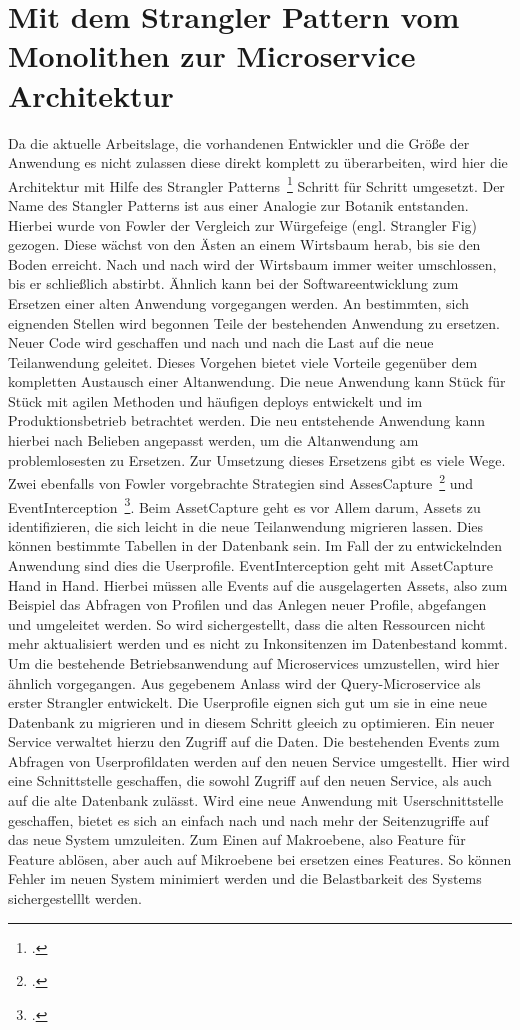 \section{Mit dem Strangler Pattern vom Monolithen zur Microservice Architektur}
Da die aktuelle Arbeitslage, die vorhandenen Entwickler und die Größe der Anwendung es nicht zulassen diese direkt komplett zu überarbeiten, wird hier die Architektur mit Hilfe des Strangler Patterns~\footcite[][]{Fowler:Strangler} Schritt für Schritt umgesetzt.
Der Name des Stangler Patterns ist aus einer Analogie zur Botanik entstanden. Hierbei wurde von Fowler der Vergleich zur Würgefeige (engl. Strangler Fig) gezogen. Diese wächst von den Ästen an einem Wirtsbaum herab, bis sie den Boden erreicht. Nach und nach wird der Wirtsbaum immer weiter umschlossen, bis er schließlich abstirbt.
Ähnlich kann bei der Softwareentwicklung zum Ersetzen einer alten Anwendung vorgegangen werden. An bestimmten, sich eignenden Stellen wird begonnen Teile der bestehenden Anwendung zu ersetzen. Neuer Code wird geschaffen und nach und nach die Last auf die neue Teilanwendung geleitet.
Dieses Vorgehen bietet viele Vorteile gegenüber dem kompletten Austausch einer Altanwendung. Die neue Anwendung kann Stück für Stück mit agilen Methoden und häufigen deploys entwickelt und im Produktionsbetrieb betrachtet werden. Die neu entstehende Anwendung kann hierbei nach Belieben angepasst werden, um die Altanwendung am problemlosesten zu Ersetzen.
Zur Umsetzung dieses Ersetzens gibt es viele Wege. Zwei ebenfalls von Fowler vorgebrachte Strategien sind AssesCapture~\footcite[][]{Fowler:Capture} und EventInterception~\footcite[][]{Fowler:Interception}.
Beim AssetCapture geht es vor Allem darum, Assets zu identifizieren, die sich leicht in die neue Teilanwendung migrieren lassen. Dies können bestimmte Tabellen in der Datenbank sein. Im Fall der zu entwickelnden Anwendung sind dies die Userprofile.
EventInterception geht mit AssetCapture Hand in Hand. Hierbei müssen alle Events auf die ausgelagerten Assets, also zum Beispiel das Abfragen von Profilen und das Anlegen neuer Profile, abgefangen und umgeleitet werden.
So wird sichergestellt, dass die alten Ressourcen nicht mehr aktualisiert werden und es nicht zu Inkonsitenzen im Datenbestand kommt.
Um die bestehende Betriebsanwendung auf Microservices umzustellen, wird hier ähnlich vorgegangen. Aus gegebenem Anlass wird der Query-Microservice als erster Strangler entwickelt. Die Userprofile eignen sich gut um sie in eine neue Datenbank zu migrieren und in diesem Schritt gleeich zu optimieren. Ein neuer Service verwaltet hierzu den Zugriff auf die Daten. Die bestehenden Events zum Abfragen von Userprofildaten werden auf den neuen Service umgestellt. Hier wird eine Schnittstelle geschaffen, die sowohl Zugriff auf den neuen Service, als auch auf die alte Datenbank zulässt. Wird eine neue Anwendung mit Userschnittstelle geschaffen, bietet es sich an einfach nach und nach mehr der Seitenzugriffe auf das neue System umzuleiten. Zum Einen auf Makroebene, also Feature für Feature ablösen, aber auch auf Mikroebene bei ersetzen eines Features. So können Fehler im neuen System minimiert werden und die Belastbarkeit des Systems sichergestelllt werden.
